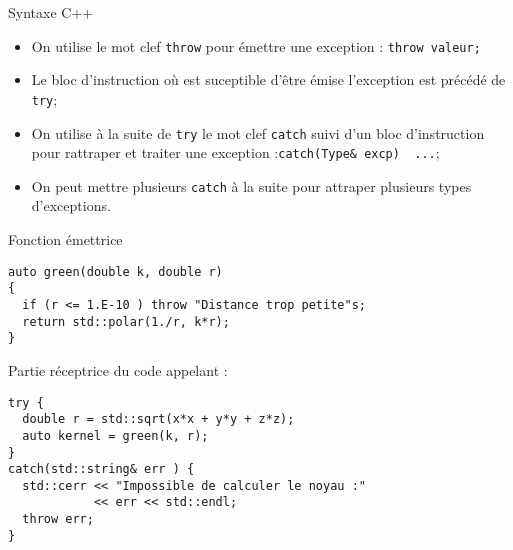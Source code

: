 \documentclass[compress,10pt,aspectratio=169]{beamer}
\begin{document}
\begin{frame}[fragile]{Syntaxe C++}
  \scriptsize
    \begin{itemize}
    \item On utilise le mot clef \texttt{throw} pour émettre une exception : \texttt{throw valeur;}
    \item Le bloc d'instruction où est suceptible d'être émise l'exception est précédé de \texttt{try};
    \item On utilise à la suite de \texttt{try} le mot clef \texttt{catch} suivi d'un bloc d'instruction pour rattraper et traiter une exception :\texttt{catch(Type& excp) { ...}};
    \item On peut mettre plusieurs \texttt{catch} à la suite pour attraper plusieurs types d'exceptions.
    \end{itemize}
    
    \begin{multicols}{2}
    Fonction émettrice
\begin{verbatim}
auto green(double k, double r)
{
  if (r <= 1.E-10 ) throw "Distance trop petite"s;
  return std::polar(1./r, k*r);
}
\end{verbatim}
\columnbreak
Partie réceptrice du code appelant :
\begin{verbatim}
try {
  double r = std::sqrt(x*x + y*y + z*z);
  auto kernel = green(k, r);
}
catch(std::string& err ) {
  std::cerr << "Impossible de calculer le noyau :" 
            << err << std::endl;
  throw err;
}
\end{verbatim}
\end{multicols}    
\end{frame}
\end{document}
